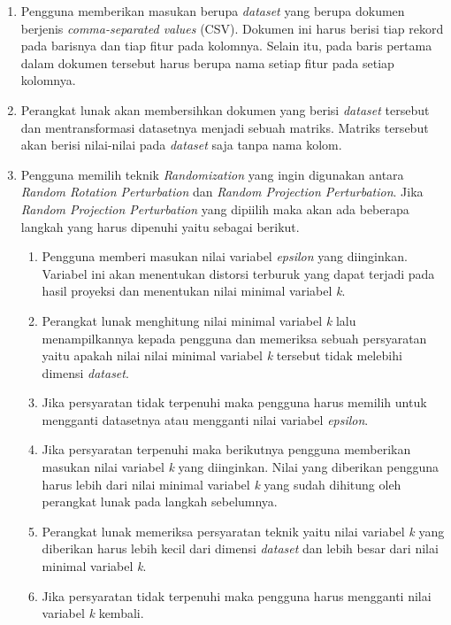 \begin{enumerate}
    \item Pengguna memberikan masukan berupa \textit{dataset} yang berupa dokumen berjenis \textit{comma-separated values} (CSV). Dokumen ini harus berisi tiap rekord pada barisnya dan tiap fitur pada kolomnya. Selain itu, pada baris pertama dalam dokumen tersebut harus berupa nama setiap fitur pada setiap kolomnya.
    \item Perangkat lunak akan membersihkan dokumen yang berisi \textit{dataset} tersebut dan mentransformasi datasetnya menjadi sebuah matriks. Matriks tersebut akan berisi nilai-nilai pada \textit{dataset} saja tanpa nama kolom.
    \item Pengguna memilih teknik \textit{Randomization} yang ingin digunakan antara \textit{Random Rotation Perturbation} dan \textit{Random Projection Perturbation}. Jika \textit{Random Projection Perturbation} yang dipiilih maka akan ada beberapa langkah yang harus dipenuhi yaitu sebagai berikut.
    \begin{enumerate}
        \item Pengguna memberi masukan nilai variabel \textit{epsilon} yang diinginkan. Variabel ini akan menentukan distorsi terburuk yang dapat terjadi pada hasil proyeksi dan menentukan nilai minimal variabel \textit{k}.
        \item Perangkat lunak menghitung nilai minimal variabel \textit{k} lalu menampilkannya kepada pengguna dan memeriksa sebuah persyaratan yaitu apakah nilai nilai minimal variabel \textit{k} tersebut tidak melebihi dimensi \textit{dataset}.
        \item Jika persyaratan tidak terpenuhi maka pengguna harus memilih untuk mengganti datasetnya atau mengganti nilai variabel \textit{epsilon}.
        \item Jika persyaratan terpenuhi maka berikutnya pengguna memberikan masukan nilai variabel \textit{k} yang diinginkan. Nilai yang diberikan pengguna harus lebih dari nilai minimal variabel \textit{k} yang sudah dihitung oleh perangkat lunak pada langkah sebelumnya.
        \item Perangkat lunak memeriksa persyaratan teknik yaitu nilai variabel \textit{k} yang diberikan harus lebih kecil dari dimensi \textit{dataset} dan lebih besar dari nilai minimal variabel \textit{k}.
        \item Jika persyaratan tidak terpenuhi maka pengguna harus mengganti nilai variabel \textit{k} kembali.
    \end{enumerate}

\end{enumerate}
